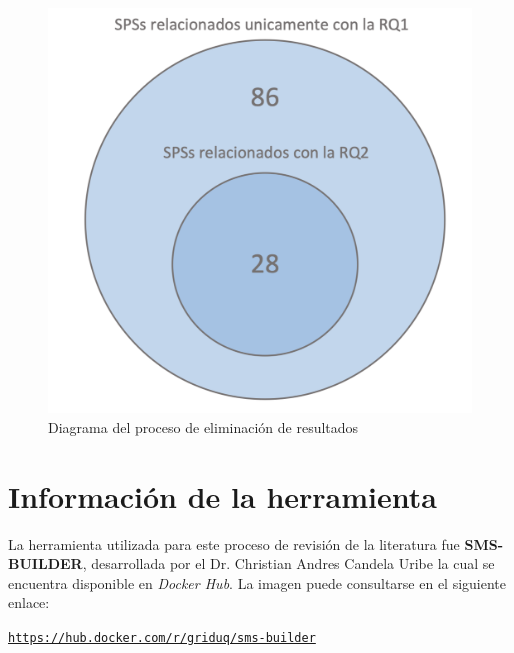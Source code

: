 \begin{figure}[H]
	\centering
	\includegraphics[scale=0.3] {tablas-images/sms/plot-venn-RQs.png}
	\caption{Diagrama del proceso de eliminación de resultados}\label{fig:plot-venn-RQs}
\end{figure}



\section{Información de la herramienta}

\noindent
La herramienta utilizada para este proceso de revisión de la literatura fue \textbf{SMS-BUILDER}, desarrollada por el Dr. Christian Andres Candela Uribe la cual se encuentra disponible en \textit{Docker Hub}. La imagen puede consultarse en el siguiente enlace:

\begin{center}
	\href{https://hub.docker.com/r/griduq/sms-builder}{\texttt{https://hub.docker.com/r/griduq/sms-builder}}
\end{center}



